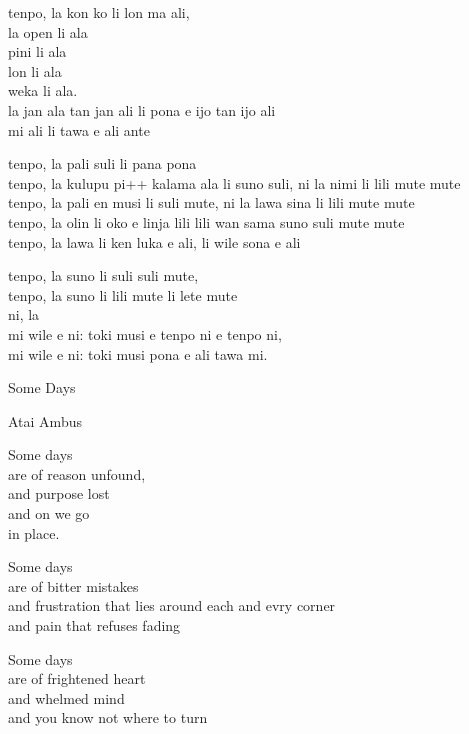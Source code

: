 \documentclass{article}
\begin{document}
    tenpo, la kon ko li lon ma ali, \\
    la open li ala \\
    pini li ala \\
    lon li ala \\
    weka li ala. \\
    la jan ala tan jan ali li pona e ijo tan ijo ali \\
    mi ali li tawa e ali ante

    tenpo, la pali suli li pana pona \\
    tenpo, la kulupu pi++ kalama ala li suno suli, ni la nimi li lili mute mute \\
    tenpo, la pali en musi li suli mute, ni la lawa sina li lili mute mute \\
    tenpo, la olin li oko e linja lili lili wan sama suno suli mute mute \\
    tenpo, la lawa li ken luka e ali, li wile sona e ali

    \bigskip

    tenpo, la suno li suli suli mute, \\
    tenpo, la suno li lili mute li lete mute \\
    ni, la \\
    mi wile e ni: toki musi e tenpo ni e tenpo ni, \\
    mi wile e ni: toki musi pona e ali tawa mi.


    \pagebreak


        \begin{center}
          {\huge Some Days} \par
          {\Large Atai Ambus}
        \end{center}


        Some days \\
        are of reason unfound, \\
        and purpose lost \\
        and on we go \\
        in place.

        Some days \\
        are of bitter mistakes \\
        and frustration that lies around each and evry corner \\
        and pain that refuses fading

        Some days \\
        are of frightened heart \\
        and whelmed mind \\
        and you know not where to turn
\end{document}
